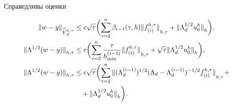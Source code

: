 \begin{lem} Справедливы оценки


\begin{align}


{\ver w-y\ver}_{\overset{\circ}{V}{}_2^{h,\tau}} &\le


 c\sqrt\tau\biggl(\sum_{i=2}^n\beta_{i-1}(\tau,h)


 {\ver f^{h,\tau}_{(i)}\ver}_{h,\tau}+


 {\ver\Lambda_d^{1/2}u_0^h\ver}_h\biggr),\\


%


{\ver \Lambda^{1/2}(w-y)\ver}_{h,\tau} &\le


 c\biggl(\sum_{i=2}^n\frac{\tau}{h_{\min}^{(i-1)}}


 {\ver f^{h,\tau}_{(i)}\ver}_{h,\tau}


 +\sqrt\tau{\ver\Lambda_d^{1/2}u_0^h\ver}_h


 \biggr), \\


%


{\ver \Lambda^{1/2}(w-y)\ver}_{h,\tau} &\le 


 c\sqrt\tau\biggl(\sum_{i=2}^n{\ver(\Lambda_d^{(i-1)})^{1/2}


 (\Lambda_d-\Lambda_d^{(i-1)}


)^{-1/2}f_{(i)}^{h,\tau}\ver}_{h,\tau}+\notag \\


%


&\quad+{\ver\Lambda_d^{1/2}u_0^h\ver}_h\biggr).


\end{align}


\end{lem}





